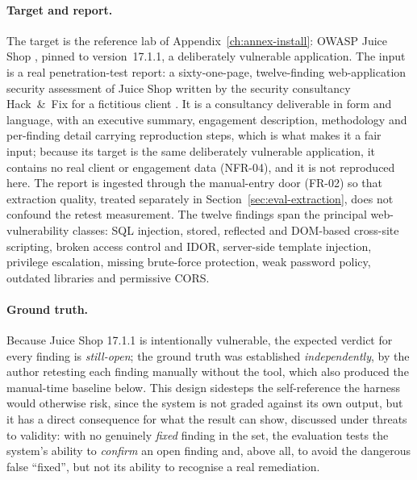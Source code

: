 \paragraph{Target and report.} The target is the reference lab of
Appendix~\ref{ch:annex-install}: OWASP Juice Shop \cite{owasp_juiceshop}, pinned to
version~17.1.1, a deliberately vulnerable application. The input is a real
penetration-test report: a sixty-one-page, twelve-finding web-application security
assessment of Juice Shop written by the security consultancy Hack~\&~Fix for a
fictitious client \cite{hackandfix_juiceshop}. It is a consultancy deliverable in
form and language, with an executive summary, engagement description, methodology and
per-finding detail carrying reproduction steps, which is what makes it a fair input;
because its target is the same deliberately vulnerable application, it contains no
real client or engagement data (NFR-04), and it is not reproduced here. The report is
ingested through the manual-entry door (FR-02) so that extraction quality, treated
separately in Section~\ref{sec:eval-extraction}, does not confound the retest
measurement. The twelve findings span the
principal web-vulnerability classes: SQL injection, stored, reflected and DOM-based
cross-site scripting, broken access control and IDOR, server-side template
injection, privilege escalation, missing brute-force protection, weak password
policy, outdated libraries and permissive CORS.

\paragraph{Ground truth.} Because Juice Shop 17.1.1 is intentionally vulnerable, the
expected verdict for every finding is \emph{still-open}; the ground truth was
established \emph{independently}, by the author retesting each finding manually
without the tool, which also produced the manual-time baseline below. This design
sidesteps the self-reference the harness would otherwise risk, since the system is not
graded against its own output, but it has a direct consequence for what the result
can show, discussed under threats to validity: with no genuinely \emph{fixed}
finding in the set, the evaluation tests the system's ability to \emph{confirm} an
open finding and, above all, to avoid the dangerous false ``fixed'', but not its
ability to recognise a real remediation.

